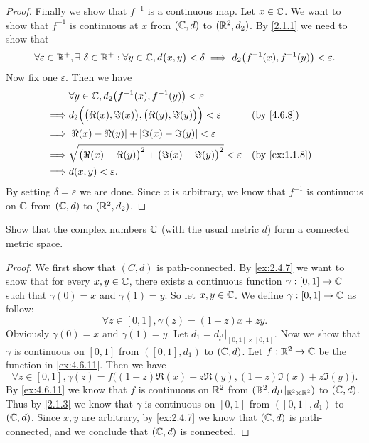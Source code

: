 \begin{proof}
  Finally we show that \(f^{-1}\) is a continuous map.
  Let \(x \in \mathbb{C}\).
  We want to show that \(f^{-1}\) is continuous at \(x\) from \((\mathbb{C}, d)\) to \((\mathbb{R}^2, d_2)\).
  By \cref{2.1.1} we need to show that
  \[
    \forall \varepsilon \in \mathbb{R}^+, \exists\ \delta \in \mathbb{R}^+ : \forall y \in \mathbb{C}, d\big(x, y\big) < \delta \implies d_2\big(f^{-1}(x), f^{-1}(y)\big) < \varepsilon.
  \]
  Now fix one \(\varepsilon\).
  Then we have
  \begin{align*}
             & \forall y \in \C, d_2\big(f^{-1}(x), f^{-1}(y)\big) < \varepsilon                                               \\
    \implies & d_2\Big(\big(\Re(x), \Im(x)\big), \big(\Re(y), \Im(y)\big)\Big) < \varepsilon  &  & \by{4.6.8}                  \\
    \implies & \abs{\Re(x) - \Re(y)} + \abs{\Im(x) - \Im(y)} < \varepsilon                                                     \\
    \implies & \sqrt{\big(\Re(x) - \Re(y)\big)^2 + \big(\Im(x) - \Im(y)\big)^2} < \varepsilon &  & \text{(by \cref{ex:1.1.8})} \\
    \implies & d(x, y) < \varepsilon.
  \end{align*}
  By setting \(\delta = \varepsilon\) we are done.
  Since \(x\) is arbitrary, we know that \(f^{-1}\) is continuous on \(\mathbb{C}\) from \((\mathbb{C}, d)\) to \((\mathbb{R}^2, d_2)\).
\end{proof}

\begin{ex}\label{ex:4.6.12}
  Show that the complex numbers \(\mathbb{C}\) (with the usual metric \(d\)) form a connected metric space.
\end{ex}

\begin{proof}
  We first show that \((C, d)\) is path-connected.
  By \cref{ex:2.4.7} we want to show that for every \(x, y \in \mathbb{C}\), there exists a continuous function \(\gamma : [0, 1] \to \mathbb{C}\) such that \(\gamma(0) = x\) and \(\gamma(1) = y\).
  So let \(x, y \in \mathbb{C}\).
  We define \(\gamma : [0, 1] \to \mathbb{C}\) as follow:
  \[
    \forall z \in [0, 1], \gamma(z) = (1 - z)x + zy.
  \]
  Obviously \(\gamma(0) = x\) and \(\gamma(1) = y\).
  Let \(d_1 = d_{l^1}|_{[0, 1] \times [0, 1]}\).
  Now we show that \(\gamma\) is continuous on \([0, 1]\) from \(([0, 1], d_1)\) to \((\mathbb{C}, d)\).
  Let \(f : \mathbb{R}^2 \to \mathbb{C}\) be the function in \cref{ex:4.6.11}.
  Then we have
  \[
    \forall z \in [0, 1], \gamma(z) = f\big((1 - z) \Re(x) + z \Re(y), (1 - z) \Im(x) + z \Im(y)\big).
  \]
  By \cref{ex:4.6.11} we know that \(f\) is continuous on \(\mathbb{R}^2\) from \((\mathbb{R}^2, d_{l^1}|_{\mathbb{R}^2 \times \mathbb{R}^2})\) to \((\mathbb{C}, d)\).
  Thus by \cref{2.1.3} we know that \(\gamma\) is continuous on \([0, 1]\) from \(([0, 1], d_1)\) to \((\mathbb{C}, d)\).
  Since \(x, y\) are arbitrary, by \cref{ex:2.4.7} we know that \((\mathbb{C}, d)\) is path-connected, and we conclude that \((\mathbb{C}, d)\) is connected.
\end{proof}

